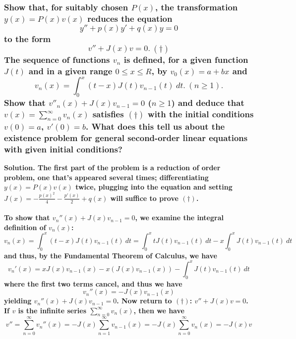 \documentclass{article}
\begin{document}
\subsubsection*{Show that, for suitably chosen $P(x)$, the transformation $y(x)=P(x)v(x)$ reduces the equation \begin{equation*}
    y''+p(x)y'+q(x)y=0
\end{equation*}to the form
\begin{equation*}
    v''+J(x)v=0.\ (\dagger)
\end{equation*}
The sequence of functions $v_n$ is defined, for a given function $J(t)$ and in a given range $0\leq x \leq R$, by $v_0(x)=a+bx$ and 
\begin{equation*}
    v_n(x)=\int_{0}^{x} (t-x)J(t)v_{n-1}(t)\ dt.\ (n\geq 1).
\end{equation*}
Show that $v''_n(x)+J(x)v_{n-1}=0$ ($n\geq 1$) and deduce that $v(x) = \sum_{n=0}^{\infty}v_n(x)$ satisfies $(\dagger)$ with the initial conditions $v(0)=a$, $v'(0)=b$. What does this tell us about the existence problem for general second-order linear equations with given initial conditions?}
\bf Solution. \normalfont The first part of the problem is a reduction of order problem, one that's appeared several times; differentiating $y(x)=P(x)v(x)$ twice, plugging into the equation and setting $J(x)=-\frac{p(x)^2}{4}-\frac{p'(x)}{2}+q(x)$ will suffice to prove $(\dagger)$. \\ \\
To show that $v_n''(x)+J(x)v_{n-1}=0$, we examine the integral definition of $v_n(x)$:
\begin{equation*}
    v_n(x)=\int_{0}^{x} (t-x)J(t)v_{n-1}(t)\ dt=\int_{0}^{x} tJ(t)v_{n-1}(t)\ dt - x\int_{0}^{x} J(t)v_{n-1}(t)\ dt
\end{equation*}
and thus, by the Fundamental Theorem of Calculus, we have
\begin{equation*}
    v_n'(x) = xJ(x)v_{n-1}(x) - x(J(x)v_{n-1}(x)) - \int_{0}^{x}J(t)v_{n-1}(t)\ dt
\end{equation*}
where the first two terms cancel, and thus we have 
\begin{equation*}
    v_n''(x)=-J(x)v_{n-1}(x)
\end{equation*}
yielding $v_n''(x)+J(x)v_{n-1}=0$. Now return to $(\dagger)$: $v'' + J(x)v=0$. If $v$ is the infinite series $\sum_{n=0}^{\infty}v_n(x)$, then we have 
\begin{equation*}
    v''=\sum_{n=0}^{\infty}v_n''(x)=-J(x)\sum_{n=1}^{\infty}v_{n-1}(x)=-J(x)\sum_{n=0}^{\infty}v_n(x)=-J(x)v
\end{equation*}
\end{document}
